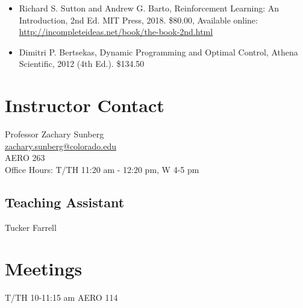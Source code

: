 \documentclass[10pt]{article}
\begin{document}
\begin{itemize}[noitemsep]
    \item Richard S. Sutton and Andrew G. Barto, Reinforcement Learning: An Introduction, 2nd Ed. MIT Press, 2018. \$80.00, Available online: \url{http://incompleteideas.net/book/the-book-2nd.html}
    \item Dimitri P. Bertsekas, Dynamic Programming and Optimal Control, Athena Scientific, 2012 (4th Ed.). \$134.50
\end{itemize}

\vspace{12pt}
\begin{multicols}{2}
    \begin{minipage}{\columnwidth}
\section*{Instructor Contact}

Professor Zachary Sunberg\\
\href{mailto://zachary.sunberg@colorado.edu}{zachary.sunberg@colorado.edu}\\
AERO 263\\
Office Hours: T/TH 11:20 am - 12:20 pm, W 4-5 pm

\subsection*{Teaching Assistant}

Tucker Farrell
    \end{minipage}

\section*{Meetings}

T/TH 10-11:15 am AERO 114
\end{multicols}
\end{document}
